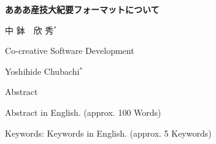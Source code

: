 \documentclass[a4j,10pt,twoside]{jarticle}
\begin{document}
\renewcommand{\thefootnote}{\fnsymbol{footnote}}{}

\vspace{-0.78cm}

\begin{center}
\vspace{0.5cm}

{\LARGE \bf 
あああ産技大紀要フォーマットについて
}

\vspace{.6cm}

{\large 
中 鉢　欣 秀$^{*}$
}

\vspace{.6cm}

{\Large 
Co-creative Software Development
}\\

\vspace{.4cm}

{\large 
Yoshihide Chubachi$^{*}$
}

\vspace{.4cm}
{\large Abstract}
\end{center}

\vspace{-2ex}
\noindent
{\normalsize
Abstract in English. (approx. 100 Words) 
\vspace{.3cm}

\noindent
Keywords: 
Keywords in English. (approx. 5 Keywords)
}

\vspace{.5cm}
\end{document}
